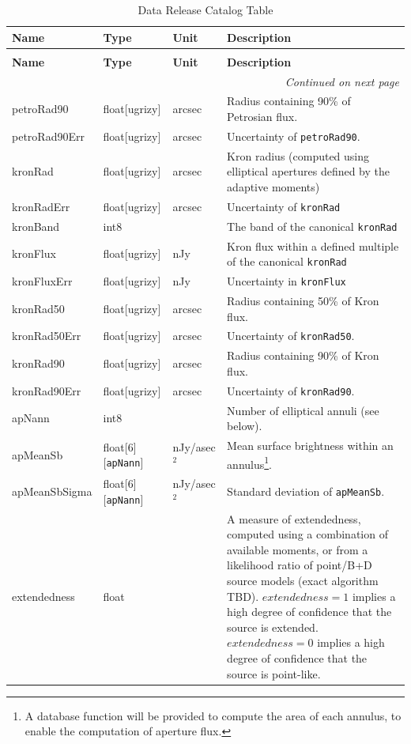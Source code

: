 \documentclass[SE,lsstdraft,toc]{lsstdoc}
\newenvironment{schema}[3]{%
\setlength\LTleft{0pt}
\setlength\LTright{\fill}
\begin{longtable}{p{0.2\textwidth}p{0.14\textwidth}p{0.14\textwidth}p{0.41\textwidth}}

\caption[#1]{#2\label{#3}}\\

\hline \textbf{Name} & \textbf{Type} & \textbf{Unit} & \textbf{Description}\\ \hline
\endfirsthead

\caption[#1]{#2}\\

\hline \textbf{Name} & \textbf{Type} & \textbf{Unit} & \textbf{Description}\\ \hline
\endhead

\hline \multicolumn{4}{r}{\emph{Continued on next page}} \\
\endfoot

\hline\hline
\endlastfoot
}{%
\hline
\end{longtable}
}
\begin{document}
\begin{schema}{\Object Table}{Data Release Catalog \Object Table}{tbl:objectTable}
petroRad90 & float[ugrizy] & arcsec & Radius containing 90\% of Petrosian flux. \\

petroRad90Err & float[ugrizy] & arcsec & Uncertainty of \texttt{petroRad90}. \\


kronRad & float[ugrizy] & arcsec & Kron radius (computed using elliptical apertures defined by the adaptive moments) \\

kronRadErr & float[ugrizy] & arcsec & Uncertainty of \texttt{kronRad} \\

kronBand & int8 & ~ & The band of the canonical \texttt{kronRad} \\

kronFlux & float[ugrizy] & nJy & Kron flux within a defined multiple of the canonical \texttt{kronRad} \\

kronFluxErr & float[ugrizy] & nJy & Uncertainty in \texttt{kronFlux} \\

kronRad50 & float[ugrizy] & arcsec & Radius containing 50\% of Kron flux. \\

kronRad50Err & float[ugrizy] & arcsec & Uncertainty of \texttt{kronRad50}. \\

kronRad90 & float[ugrizy] & arcsec & Radius containing 90\% of Kron flux. \\

kronRad90Err & float[ugrizy] & arcsec & Uncertainty of \texttt{kronRad90}. \\


apNann & int8 & ~ & Number of elliptical annuli (see below). \\

apMeanSb & float[6][\texttt{apNann}] & nJy/asec$^2$ & Mean surface brightness within an annulus\footnote{A database function will be provided to compute the area of each annulus, to enable the computation of aperture flux.}. \\

apMeanSbSigma & float[6][\texttt{apNann}] & nJy/asec$^2$ & Standard deviation of \texttt{apMeanSb}. \\

extendedness & float & ~ & A measure of extendedness, computed using a combination of available moments, or from a likelihood ratio of point/B+D source models (exact algorithm TBD). $extendedness=1$ implies a high degree of confidence that the source is extended. $extendedness=0$ implies a high degree of confidence that the source is point-like. \\


\end{schema}
\end{document}
